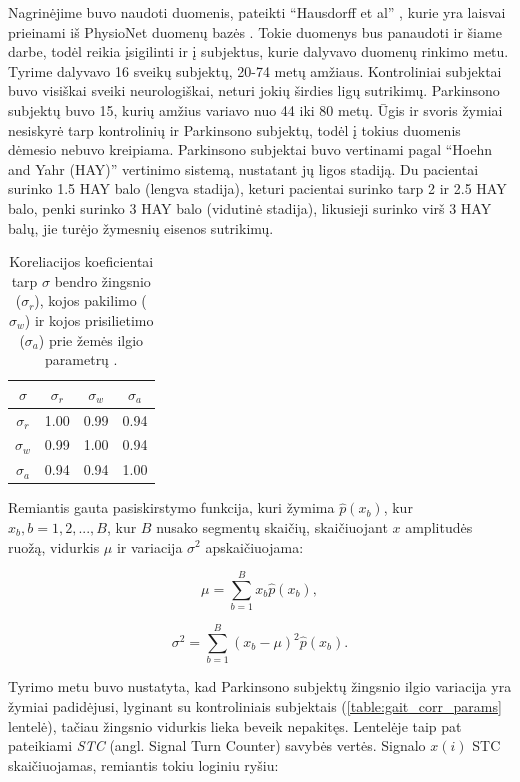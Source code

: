 \documentclass[]{vgtuef}
\begin{document}
Nagrinėjime buvo naudoti duomenis, pateikti ``Hausdorff et al'' \cite{MDS:MDS870130310}, kurie yra  laisvai prieinami iš PhysioNet duomenų bazės \cite{932728}. Tokie duomenys bus panaudoti ir šiame darbe, todėl reikia įsigilinti ir į subjektus, kurie dalyvavo duomenų rinkimo metu. Tyrime dalyvavo 16 sveikų subjektų, 20-74 metų amžiaus. Kontroliniai subjektai buvo visiškai sveiki neurologiškai, neturi jokių širdies ligų sutrikimų. Parkinsono subjektų buvo 15, kurių amžius variavo nuo 44 iki 80 metų. Ūgis ir svoris žymiai nesiskyrė tarp kontrolinių ir Parkinsono subjektų, todėl į tokius duomenis dėmesio nebuvo kreipiama. Parkinsono subjektai buvo vertinami pagal ``Hoehn and Yahr (HAY)'' vertinimo sistemą, nustatant jų ligos stadiją. Du pacientai surinko 1.5 HAY balo (lengva stadija), keturi pacientai surinko tarp 2 ir 2.5 HAY balo, penki surinko 3 HAY balo (vidutinė stadija), likusieji surinko virš 3 HAY balų, jie turėjo žymesnių eisenos sutrikimų. 

\begin{table}[b]
  \renewcommand{\arraystretch}{1.3}
  \centering
  \caption{Koreliacijos koeficientai tarp $\sigma$ bendro žingsnio ($\sigma_r$),
    kojos pakilimo ($\sigma_w$) ir kojos prisilietimo ($\sigma_a$)
    prie žemės ilgio parametrų \cite{5280353}.}
  \label{table:stance_swing_string_corr}
  \begin{tabular}{|c|c|c|c|} \hline
    $\sigma$ & $\sigma_r$ & $\sigma_w$ & $\sigma_a$ \\ \hline
    $\sigma_r$ & 1.00 & 0.99 & 0.94 \\ \hline
    $\sigma_w$ & 0.99 & 1.00 & 0.94 \\ \hline
    $\sigma_a$ & 0.94 & 0.94 & 1.00 \\ \hline
  \end{tabular}
\end{table}

Remiantis gauta pasiskirstymo funkcija, kuri žymima  $\hat{p}(x_b)$, kur $x_b, b = 1, 2, ..., B$, kur $B$ nusako segmentų skaičių, skaičiuojant $x$ amplitudės ruožą, vidurkis $\mu$ ir variacija $\sigma^2$ apskaičiuojama:

\begin{equation}
\mu = \sum_{b=1}^{B} x_b \hat{p}(x_b),
\end{equation}

\begin{equation}
\sigma^2 = \sum_{b=1}^{B} (x_b - \mu)^2 \hat{p}(x_b).
\end{equation}

Tyrimo metu buvo nustatyta, kad Parkinsono subjektų žingsnio ilgio variacija yra žymiai padidėjusi, lyginant su kontroliniais subjektais (\ref{table:gait_corr_params} lentelė), tačiau žingsnio vidurkis lieka beveik nepakitęs. Lentelėje taip pat pateikiami \textit{STC} (angl. Signal Turn Counter) savybės vertės. Signalo $x(i)$ STC skaičiuojamas, remiantis tokiu loginiu ryšiu:
\end{document}
